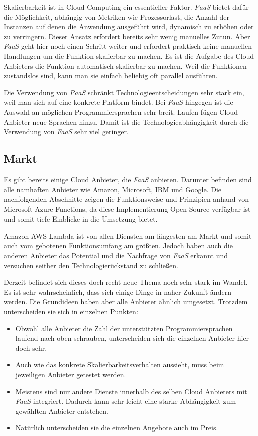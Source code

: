 Skalierbarkeit ist in Cloud-Computing ein essentieller Faktor. \textit{PaaS} bietet dafür die Möglichkeit, abhängig von Metriken wie Prozessorlast, die Anzahl der Instanzen auf denen die Anwendung ausgeführt wird, dynamisch zu erhöhen oder zu verringern. Dieser Ansatz erfordert bereits sehr wenig manuelles Zutun. Aber \textit{FaaS} geht hier noch einen Schritt weiter und erfordert praktisch keine manuellen Handlungen um die Funktion skalierbar zu machen. Es ist die Aufgabe des Cloud Anbieters die Funktion automatisch skalierbar zu machen. Weil die Funktionen zustandslos sind, kann man sie einfach beliebig oft parallel ausführen.

Die Verwendung von \textit{PaaS} schränkt Technologieentscheidungen sehr stark ein, weil man sich auf eine konkrete Platform bindet. Bei \textit{FaaS} hingegen ist die Auswahl an möglichen Programmiersprachen sehr breit. Laufen fügen Cloud Anbieter neue Sprachen hinzu. Damit ist die Technologieabhängigkeit durch die Verwendung von \textit{FaaS} sehr viel geringer.

\subsection{Markt}

Es gibt bereits einige Cloud Anbieter, die \textit{FaaS} anbieten. Darunter befinden sind alle namhaften Anbieter wie Amazon, Microsoft, IBM und Google. Die nachfolgenden Abschnitte zeigen die Funktionsweise und Prinzipien anhand von Microsoft Azure Functions, da diese Implementierung Open-Source verfügbar ist und somit tiefe Einblicke in die Umsetzung bietet. 

Amazon AWS Lambda ist von allen Diensten am längesten am Markt und somit auch vom gebotenen Funktionsumfang am größten. Jedoch haben auch die anderen Anbieter das Potential und die Nachfrage von \textit{FaaS} erkannt und versuchen seither den Technologierückstand zu schließen.

Derzeit befindet sich dieses doch recht neue Thema noch sehr stark im Wandel. Es ist sehr wahrscheinlich, dass sich einige Dinge in naher Zukunft ändern werden. Die Grundideen haben aber alle Anbieter ähnlich umgesetzt. Trotzdem unterscheiden sie sich in einzelnen Punkten:

\begin{itemize}
	\item Obwohl alle Anbieter die Zahl der unterstützten Programmiersprachen laufend nach oben schrauben, unterscheiden sich die einzelnen Anbieter hier doch sehr.
	\item Auch wie das konkrete Skalierbarkeitsverhalten aussieht, muss beim jeweiligen Anbieter getestet werden.
	\item Meistens sind nur andere Dienste innerhalb des selben Cloud Anbieters mit \textit{FaaS} integriert. Dadurch kann sehr leicht eine starke Abhängigkeit zum gewählten Anbieter entstehen.
	\item Natürlich unterscheiden sie die einzelnen Angebote auch im Preis.
\end{itemize}

